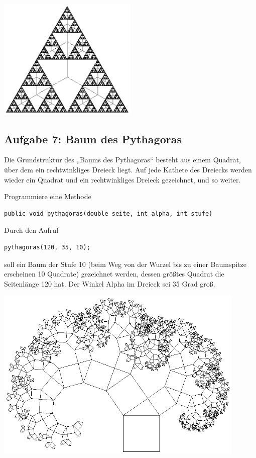 \begin{minipage}{1.0\textwidth}
  \centering
  \includegraphics[width=0.5\textwidth]{./inf/SEKII/06_Java_Rekursion/Aufgabe3_6-10.png}
\end{minipage}


\subsection{Aufgabe 7: Baum des Pythagoras}
 
Die Grundstruktur des „Baums des Pythagoras“ besteht aus einem Quadrat, über
dem ein rechtwinkliges Dreieck liegt. Auf jede Kathete des Dreiecks werden
wieder ein Quadrat und ein rechtwinkliges Dreieck gezeichnet, und so weiter.

Programmiere eine Methode

\begin{lstlisting}
public void pythagoras(double seite, int alpha, int stufe)
\end{lstlisting}

Durch den Aufruf 

\begin{lstlisting}
pythagoras(120, 35, 10);
\end{lstlisting}

soll ein Baum der Stufe 10 (beim Weg von der Wurzel bis zu einer Baumspitze
erscheinen 10 Quadrate) gezeichnet werden, dessen größtes Quadrat die
Seitenlänge 120 hat. Der Winkel Alpha im Dreieck sei 35 Grad groß.

\vspace{5mm}

\begin{minipage}{1.0\textwidth}
  \centering
  \includegraphics[width=0.9\textwidth]{./inf/SEKII/06_Java_Rekursion/Aufgabe3_7.png}
\end{minipage}\hfill